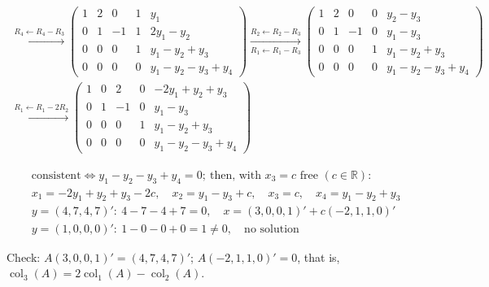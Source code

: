 \documentclass[12pt]{article}
\newcommand{\R}{\mathbb R}
\DeclareMathOperator{\col}{col}
\theoremstyle{definition}
\newcommand{\boardtop}{\vspace*{-\abovedisplayskip}}
\begin{document}
\begin{board}
\[
\begin{gathered}
\xrightarrow{R_4\leftarrow R_4-R_3}
\left(\begin{array}{cccc|c}1&2&0&1&y_1\\0&1&-1&1&2y_1-y_2\\0&0&0&1&y_1-y_2+y_3\\0&0&0&0&y_1-y_2-y_3+y_4\end{array}\right)
\xrightarrow[R_1\leftarrow R_1-R_3]{R_2\leftarrow R_2-R_3}
\left(\begin{array}{cccc|c}1&2&0&0&y_2-y_3\\0&1&-1&0&y_1-y_3\\0&0&0&1&y_1-y_2+y_3\\0&0&0&0&y_1-y_2-y_3+y_4\end{array}\right)
\\
\xrightarrow{R_1\leftarrow R_1-2R_2}
\left(\begin{array}{cccc|c}1&0&2&0&-2y_1+y_2+y_3\\0&1&-1&0&y_1-y_3\\0&0&0&1&y_1-y_2+y_3\\0&0&0&0&y_1-y_2-y_3+y_4\end{array}\right)
\end{gathered}
\]
\end{board}
\begin{board}[Read off (Proposition~\ref{b2.7}): the left part is an RREF of \(A\) (the lines after
Definition~\ref{b2.2}),
\(r=3\), pivot columns \(1,2,4\), \(z_4=y_1-y_2-y_3+y_4\):]
\boardtop
\begin{align*}
&\text{consistent}\iff y_1-y_2-y_3+y_4=0;\ \text{then, with }x_3=c\text{ free }(c\in\R)\text{:}\\
&x_1=-2y_1+y_2+y_3-2c,\quad x_2=y_1-y_3+c,\quad x_3=c,\quad x_4=y_1-y_2+y_3\\
&y=(4,7,4,7)':\ 4-7-4+7=0,\quad x=(3,0,0,1)'+c(-2,1,1,0)'\\
&y=(1,0,0,0)':\ 1-0-0+0=1\ne0,\quad\text{no solution}
\end{align*}
\end{board}
Check: \(A(3,0,0,1)'=(4,7,4,7)'\); \(A(-2,1,1,0)'=0\), that is, \(\col_3(A)=2\col_1(A)-\col_2(A)\).
\end{document}
